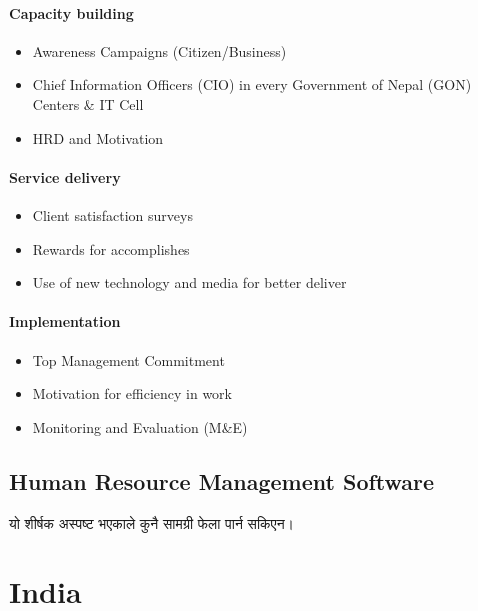 \paragraph*{Capacity building}
\begin{itemize}
	\item Awareness Campaigns (Citizen/Business) 
	\item Chief Information Officers (CIO) in every Government of Nepal (GON) Centers \& IT Cell
	\item HRD and Motivation
\end{itemize}

\paragraph*{Service delivery}
\begin{itemize}
	\item Client satisfaction surveys
	\item Rewards for accomplishes
	\item Use of new technology and media for better deliver
\end{itemize}

\paragraph*{Implementation}
\begin{itemize}
	\item Top Management Commitment
	\item Motivation for efficiency in work
\item Monitoring and Evaluation (M\&E)
\end{itemize}

\subsection{Human Resource Management Software}
\begin{framed}
	\begin{center}
		\begin{nepali}
			यो शीर्षक अस्पष्ट भएकाले कुनै सामग्री फेला पार्न सकिएन।
		\end{nepali}
	\end{center}
\end{framed}

\section{India}

